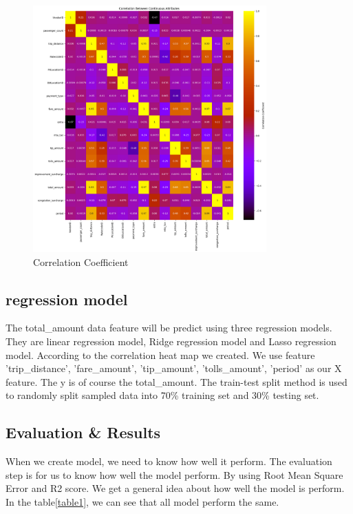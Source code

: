 \documentclass[11pt]{article}
\begin{document}
\begin{figure}[!h]
    \centering
    \includegraphics[width=0.8\textwidth]{plots/p10.png}
    \caption{Correlation Coefficient} %
    \label{fig:image9}
\end{figure}

\subsection{regression model}
The  total\_amount data feature will be predict using three regression models. They are linear regression model, Ridge regression model and Lasso regression model. According to the correlation heat map we created. We use feature 'trip\_distance', 'fare\_amount', 'tip\_amount', 'tolls\_amount', 'period' as our X feature. The y is of course the total\_amount.  The train-test split method is used to randomly split sampled data into 70\% training set and 30\% testing set.

\subsection{Evaluation & Results}

When we create model, we need to know how well it perform. The evaluation step is for us to know how well the model perform.
By using Root Mean Square Error and R2 score. We get a general idea about how well the model is perform. In the table\ref{table1}, we can see that all model perform the same.
\end{document}
